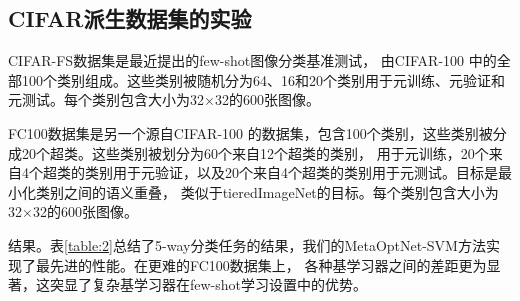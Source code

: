 \subsection{CIFAR派生数据集的实验}

CIFAR-FS数据集\cite{bertinetto2018meta}是最近提出的few-shot图像分类基准测试，
由CIFAR-100 \cite{krizhevsky2010cifar}中的全部100个类别组成。这些类别被随机分为64、16和20个类别用于元训练、元验证和元测试。每个类别包含大小为32×32的600张图像。

FC100数据集\cite{oreshkin2018tadam}是另一个源自CIFAR-100 \cite{krizhevsky2010cifar}的数据集，包含100个类别，这些类别被分成20个超类。这些类别被划分为60个来自12个超类的类别，
用于元训练，20个来自4个超类的类别用于元验证，以及20个来自4个超类的类别用于元测试。目标是最小化类别之间的语义重叠，
类似于tieredImageNet的目标。每个类别包含大小为32×32的600张图像。

结果。表\ref{table:2}总结了5-way分类任务的结果，我们的MetaOptNet-SVM方法实现了最先进的性能。在更难的FC100数据集上，
各种基学习器之间的差距更为显著，这突显了复杂基学习器在few-shot学习设置中的优势。

